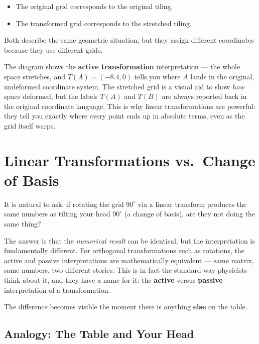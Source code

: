 \documentclass[11pt,openany]{book}
\theoremstyle{definition}
\begin{document}
\begin{itemize}
  \item The original grid corresponds to the original tiling.
  \item The transformed grid corresponds to the stretched tiling.
\end{itemize}

Both describe the same geometric situation, but they assign different coordinates because
they use different grids.

\medskip

The diagram shows the \textbf{active transformation} interpretation --- the whole space
stretches, and $T(A) = (-8.4, 0)$ tells you where $A$ lands in the original, undeformed
coordinate system. The stretched grid is a visual aid to show \textit{how} space deformed,
but the labels $T(A)$ and $T(B)$ are always reported back in the original coordinate language.
This is why linear transformations are powerful: they tell you exactly where every point
ends up in absolute terms, even as the grid itself warps.

\section{Linear Transformations vs.\ Change of Basis}

It is natural to ask: if rotating the grid $90^\circ$ via a linear transform produces the
same numbers as tilting your head $90^\circ$ (a change of basis), are they not doing the
same thing?

\medskip

The answer is that the \textit{numerical result} can be identical, but the interpretation
is fundamentally different. For orthogonal transformations such as rotations, the active
and passive interpretations are mathematically equivalent --- same matrix, same numbers,
two different stories. This is in fact the standard way physicists think about it, and they
have a name for it: the \textbf{active} versus \textbf{passive} interpretation of a
transformation.

\medskip

The difference becomes visible the moment there is anything \textbf{else} on the table.
\subsection{Analogy: The Table and Your Head}
\end{document}

